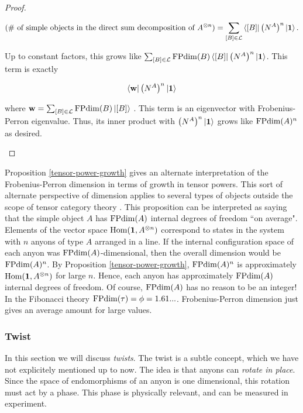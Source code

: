 \begin{proof}
\begin{enumerate}[(i)]
$$(\text{\# of simple objects in the direct sum decomposition of $A^{\otimes n}$})=\sum_{[B]\in{\mathcal L}}\bra{[B]}\big(N^A\big)^n\ket{{\mathbf 1}}.$$

Up to constant factors, this grows like $\sum_{[B]\in{\mathcal L}}\operatorname{FPdim}(B)\bra{[B]}\big(N^A\big)^n\ket{{\mathbf 1}}$. This term is exactly

$$\bra{\bold{w}}\big(N^A\big)^n\ket{{\mathbf 1}}$$

where $\bold{w}=\sum_{[B]\in{\mathcal L}}\operatorname{FPdim}(B)\ket{[B]}$ . This term is an eigenvector with Frobenius-Perron eigenvalue. Thus, its inner product with $\big(N^A\big)^n\ket{{\mathbf 1}}$ grows like $\operatorname{FPdim}(A)^n$ as desired.
\end{enumerate}
\end{proof}

\begin{rem}
Proposition \ref{tensor-power-growth} gives an alternate interpretation of the Frobenius-Perron dimension in terms of growth in tensor powers. This sort of alternate perspective of dimension applies to several types of objects outside the scope of tensor category theory \cite{coulembier2024growth}. This proposition can be interpreted as saying that the simple object $A$ has $\operatorname{FPdim}(A)$ internal degrees of freedom ``on average". Elements of the vector space $\operatorname{Hom}({\mathbf 1},A^{\otimes n})$ correspond to states in the system with $n$ anyons of type $A$ arranged in a line. If the internal configuration space of each anyon was $\operatorname{FPdim}(A)$-dimensional, then the overall dimension would be $\operatorname{FPdim}(A)^n$. By Proposition \ref{tensor-power-growth}, $\operatorname{FPdim}(A)^n$ is approximately $\operatorname{Hom}({\mathbf 1},A^{\otimes n})$ for large $n$. Hence, each anyon has approximately $\operatorname{FPdim}(A)$ internal degrees of freedom. Of course, $\operatorname{FPdim}(A)$ has no reason to be an integer! In the Fibonacci theory $\operatorname{FPdim}(\tau)=\phi=1.61...$. Frobenius-Perron dimension just gives an average amount for large values.
\end{rem}

\subsubsection{Twist}

In this section we will discuss {\em twists}. The twist is a subtle concept, which we have not explicitely mentioned up to now. The idea is that anyons can {\em rotate in place}. Since the space of endomorphisms of an anyon is one dimensional, this rotation must act by a phase. This phase is physically relevant, and can be measured in experiment.

